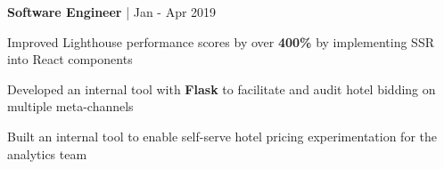 \begin{cventries}

\cventry
{\textbf{Software Engineer} | \color{awesome}{Super}}
{Jan - Apr 2019} %
{ %
\begin{cvitems}
\item {Improved Lighthouse performance scores by over \textbf{400\%} by implementing SSR into React components}
\item {Developed an internal tool with \textbf{Flask} to facilitate and audit hotel bidding on multiple meta-channels}
\item {Built an internal tool to enable self-serve hotel pricing experimentation for the analytics team}
\end{cvitems}
}






\end{cventries}
